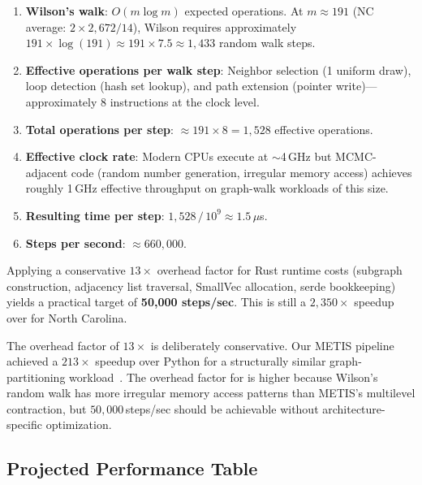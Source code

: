 \begin{enumerate}
  \item \textbf{Wilson's walk}: $O(m\log m)$ expected operations.
    At $m \approx 191$ (NC average: $2 \times 2{,}672 / 14$),
    Wilson requires approximately $191 \times \log(191) \approx 191 \times 7.5 \approx 1{,}433$
    random walk steps.
  \item \textbf{Effective operations per walk step}: Neighbor selection
    (1 uniform draw), loop detection (hash set lookup), and
    path extension (pointer write)---approximately 8 instructions at the
    clock level.
  \item \textbf{Total operations per \recom{} step}: $\approx 191 \times 8 = 1{,}528$
    effective operations.
  \item \textbf{Effective clock rate}: Modern CPUs execute at
    $\sim$4\,GHz but MCMC-adjacent code (random number generation,
    irregular memory access) achieves roughly 1\,GHz effective throughput
    on graph-walk workloads of this size.
  \item \textbf{Resulting time per step}: $1{,}528 \,/\, 10^9 \approx 1.5\,\mu$s.
  \item \textbf{Steps per second}: $\approx 660{,}000$.
\end{enumerate}

Applying a conservative $13\times$ overhead factor for Rust runtime costs
(subgraph construction, adjacency list traversal, SmallVec allocation,
serde bookkeeping) yields a practical target of \textbf{50{,}000 steps/sec}.
This is still a $2{,}350\times$ speedup over \gc{} for North Carolina.

\begin{remark}
The overhead factor of $13\times$ is deliberately conservative.
Our METIS pipeline achieved a $213\times$ speedup over Python for a
structurally similar graph-partitioning workload~\citep{dellaLibera2026b1}.
The overhead factor for \re{} is higher because Wilson's random walk has
more irregular memory access patterns than METIS's multilevel contraction,
but $50{,}000$\,steps/sec should be achievable without architecture-specific
optimization.
\end{remark}

\subsection{Projected Performance Table}

